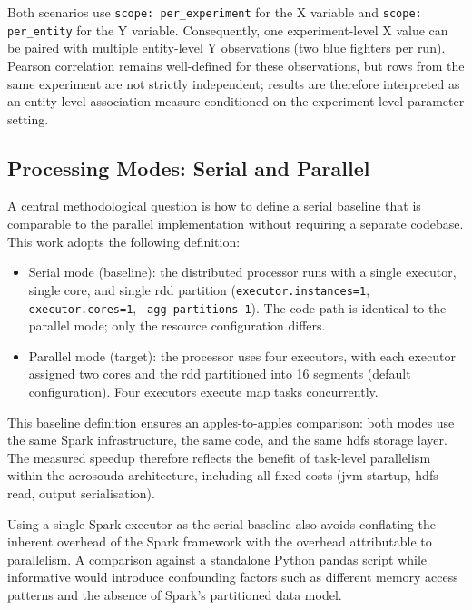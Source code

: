 Both scenarios use \texttt{scope: per\_experiment} for the X variable and
\texttt{scope: per\_entity} for the Y variable.  Consequently, one experiment-level X
value can be paired with multiple entity-level Y observations (two blue fighters per
run).  Pearson correlation remains well-defined for these observations, but rows from the
same experiment are not strictly independent; results are therefore interpreted as an
entity-level association measure conditioned on the experiment-level parameter setting.

\subsection{Processing Modes: Serial and Parallel}
\label{subsec:eval-modes}

A central methodological question is how to define a serial baseline that is
comparable to the parallel implementation without requiring a separate codebase.  This work
adopts the following definition:

\begin{itemize}
    \item Serial mode (baseline): the distributed processor runs with a single
          executor, single core, and single \gls{rdd} partition
          (\texttt{executor.instances=1},
          \texttt{executor.cores=1},
          \texttt{--agg-partitions~1}).
          The code path is identical to the parallel mode; only the resource
          configuration differs.
    \item Parallel mode (target): the processor uses four executors, with each
          executor assigned two cores and the \gls{rdd} partitioned into 16
          segments (default configuration).  Four executors execute map tasks concurrently.
\end{itemize}

This baseline definition ensures an apples-to-apples comparison: both modes use the same
Spark infrastructure, the same code, and the same \gls{hdfs} storage layer.  The measured
speedup therefore reflects the benefit of task-level parallelism within the
\gls{aerosouda} architecture, including all fixed costs (\gls{jvm} startup, \gls{hdfs} read, output serialisation).

Using a single Spark executor as the serial baseline also avoids conflating the inherent
overhead of the Spark framework with the overhead attributable to parallelism.  A comparison
against a standalone Python pandas script while informative would introduce confounding
factors such as different memory access patterns and the absence of Spark's partitioned
data model.

